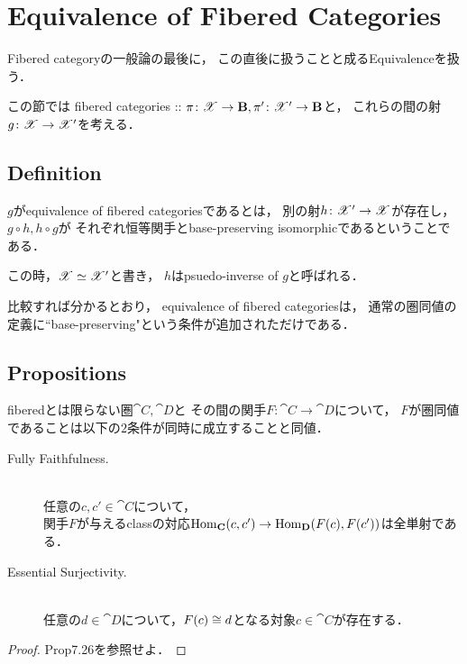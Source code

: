 \documentclass[a4paper, dvipdfmx]{jsarticle}
\begin{document}
\section{Equivalence of Fibered Categories}
    Fibered categoryの一般論の最後に，
    この直後に扱うことと成るEquivalenceを扱う．
    
    この節では
    fibered categories :: $\pi \colon \mathscr{X} \to \mathbf{B}, \pi' \colon \mathscr{X}' \to \mathbf{B}$と，
    これらの間の射$g \colon \mathscr{X} \to \mathscr{X}'$を考える．

\subsection{Definition}
    \begin{Def}[Equivalence]
        $g$がequivalence of fibered categoriesであるとは，
        別の射$h \colon \mathscr{X}' \to \mathscr{X}$が存在し，
        $g \circ h, h \circ g$が
        それぞれ恒等関手とbase-preserving isomorphicであるということである．

        この時，$\mathscr{X} \simeq \mathscr{X}'$と書き，
        $h$はpsuedo-inverse of $g$と呼ばれる．
    \end{Def}
    \begin{Remark}
        比較すれば分かるとおり，
        equivalence of fibered categoriesは，
        通常の圏同値の定義に``base-preserving"という条件が追加されただけである．
    \end{Remark}

\subsection{Propositions}
    \begin{Prop}
        fiberedとは限らない圏$\cat{C}, \cat{D}$と
        その間の関手$F \colon \cat{C} \to \cat{D}$について，
        $F$が圏同値であることは以下の$2$条件が同時に成立することと同値．
        \begin{description}
            \item[Fully Faithfulness.] \mbox{}\\
                任意の$c,c' \in \cat{C}$について，\mbox{}\\
                関手$F$が与えるclassの対応$\operatorname{Hom}_{\mathbf{C}}(c, c') \to \operatorname{Hom}_{\mathbf{D}}(F(c), F(c'))$は全単射である．

            \item[Essential Surjectivity.] \mbox{}\\
                任意の$d \in \cat{D}$について，$F(c) \cong d$となる対象$c \in \cat{C}$が存在する．
        \end{description}
    \end{Prop}
    \begin{proof}
        \cite{Awodey} Prop7.26を参照せよ．
    \end{proof}
\end{document}
